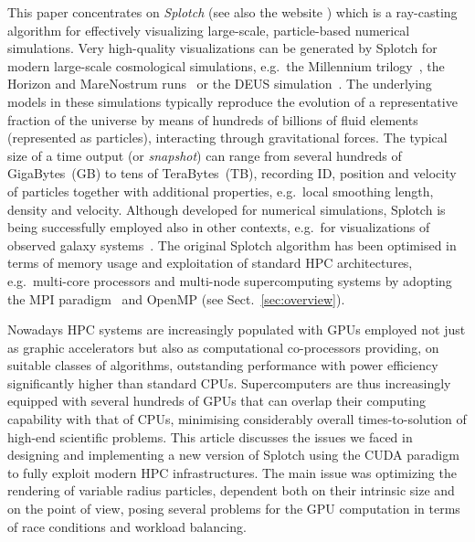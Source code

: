 \documentclass[preprint,5pt]{elsarticle}
\begin{document}
This paper concentrates on {\it Splotch} \cite{2008NJPh...10l5006D} (see also the website \cite{splotch-web})
 which is a ray-casting algorithm for effectively visualizing large-scale, particle-based numerical simulations. Very high-quality visualizations can be generated by Splotch for modern large-scale cosmological simulations, e.g.\ the Millennium trilogy~\cite{millennium}, the Horizon and MareNostrum runs~\cite{horizon} or the DEUS simulation~\cite{deus}. The underlying models in these simulations typically reproduce the evolution of a representative fraction of the universe by means of hundreds of billions of fluid elements (represented as particles), interacting through gravitational forces. The typical size of a time output (or {\it snapshot}) can range from several hundreds of GigaBytes~(GB) to tens of TeraBytes~(TB), recording ID, position and velocity of particles together with additional properties, e.g.\ local smoothing length, density and velocity. Although developed for numerical simulations, Splotch is being successfully employed also in other contexts, e.g.\ for visualizations of observed galaxy systems~\cite{m83-vis}.
The original Splotch algorithm has been optimised in terms of memory usage and exploitation of standard HPC architectures, e.g.\ multi-core processors and multi-node supercomputing systems by adopting the MPI paradigm~\cite{jin:high-performance} and OpenMP (see Sect.~\ref{sec:overview}).

Nowadays HPC systems are increasingly populated with GPUs employed not just as graphic accelerators but also as computational co-processors providing, on suitable classes of algorithms, outstanding performance with power efficiency significantly higher than standard CPUs. Supercomputers are thus increasingly equipped with several hundreds of GPUs that can overlap their computing capability with that of CPUs, minimising considerably overall times-to-solution of high-end scientific problems. This article discusses the issues we faced in designing and implementing a new version of Splotch using the CUDA paradigm~\cite{cudaurl} to fully exploit modern HPC infrastructures. The main issue was optimizing the rendering of variable radius particles, dependent both on their intrinsic size and on the point of view, posing several problems for the GPU computation in terms of race conditions and workload balancing. 
\end{document}
